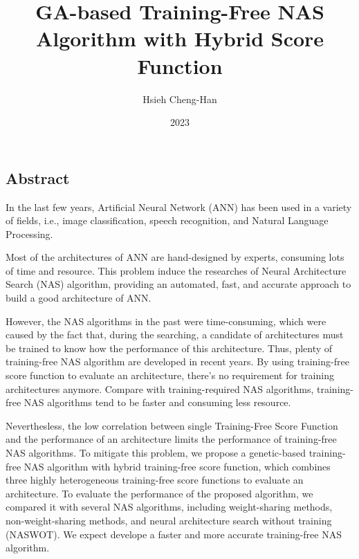 \documentclass[twocolumn,10pt]{article}
\title{GA-based Training-Free NAS Algorithm with Hybrid Score Function}
\author{Hsieh Cheng-Han}
\date{2023}
\begin{document}
\begin{CJK*}{UTF8}{bsmi}

\maketitle

\section{Abstract}
    In the last few years, Artificial Neural Network (ANN) has been used in a variety of fields, i.e., image classification, speech recognition, and Natural Language Processing.\par
Most of the architectures of ANN are hand-designed by experts, consuming lots of time and resource. This problem induce the researches of Neural Architecture Search (NAS) algorithm, providing an automated, fast, and accurate approach to build a good architecture of ANN.\par
    However, the NAS algorithms in the past were time-consuming, which were caused by the fact that, during the searching, a candidate of architectures must be trained to know how the performance of this architecture. Thus, plenty of training-free NAS algorithm are developed in recent years. By using training-free score function to evaluate an architecture, there's no requirement for training architectures anymore. Compare with training-required NAS algorithms, training-free NAS algorithms tend to be faster and consuming less resource.\par
    Neverthesless, the low correlation between single Training-Free Score Function and the performance of an architecture limits the performance of training-free NAS algorithms. To mitigate this problem, we propose a genetic-based training-free NAS algorithm with hybrid training-free score function, which combines three highly heterogeneous training-free score functions to evaluate an architecture. To evaluate the performance of the proposed algorithm, we compared it with several NAS algorithms, including weight-sharing methods, non-weight-sharing methods, and neural architecture search without training (NASWOT). We expect develope a faster and more accurate training-free NAS algorithm.\par

\begin{thebibliography}{9}
\end{thebibliography}


\end{CJK*}
\end{document}
